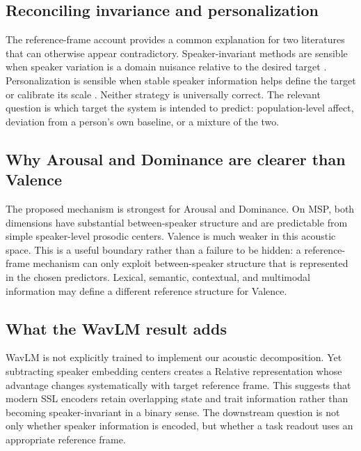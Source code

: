 \documentclass[11pt]{article}
\begin{document}
\subsection{Reconciling invariance and personalization}

The reference-frame account provides a common explanation for two literatures that can otherwise appear contradictory.
Speaker-invariant methods are sensible when speaker variation is a domain nuisance relative to the desired target \citep{gat2022speaker}.
Personalization is sensible when stable speaker information helps define the target or calibrate its scale \citep{sridhar2022personalization,tran2023personalized,triantafyllopoulos2024enrolment}.
Neither strategy is universally correct.
The relevant question is which target the system is intended to predict: population-level affect, deviation from a person's own baseline, or a mixture of the two.

\subsection{Why Arousal and Dominance are clearer than Valence}

The proposed mechanism is strongest for Arousal and Dominance.
On MSP, both dimensions have substantial between-speaker structure and are predictable from simple speaker-level prosodic centers.
Valence is much weaker in this acoustic space.
This is a useful boundary rather than a failure to be hidden: a reference-frame mechanism can only exploit between-speaker structure that is represented in the chosen predictors.
Lexical, semantic, contextual, and multimodal information may define a different reference structure for Valence.

\subsection{What the WavLM result adds}

WavLM \citep{chen2022wavlm} is not explicitly trained to implement our acoustic decomposition.
Yet subtracting speaker embedding centers creates a Relative representation whose advantage changes systematically with target reference frame.
This suggests that modern SSL encoders retain overlapping state and trait information rather than becoming speaker-invariant in a binary sense.
The downstream question is not only whether speaker information is encoded, but whether a task readout uses an appropriate reference frame.
\end{document}
